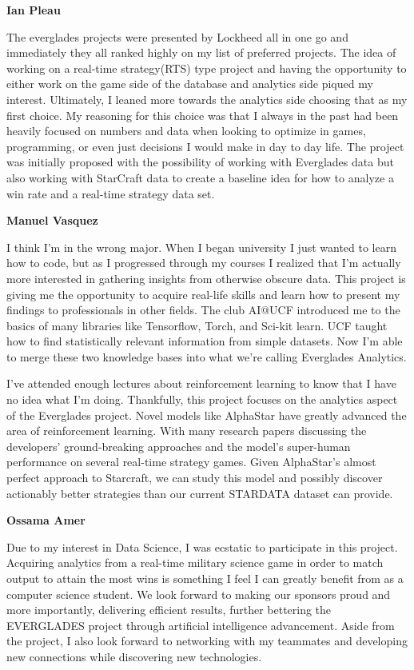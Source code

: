 \documentclass[a4paper,12pt]{report}
\newcommand{\msection}[1]{\noindent\textbf{#1}}
\begin{document}
\msection{Ian Pleau}

The everglades projects were presented by Lockheed all in one go and immediately they all ranked highly on my list of preferred projects. The idea of working on a real-time strategy(RTS) type project and having the opportunity to either work on the game side of the database and analytics side piqued my interest. Ultimately, I leaned more towards the analytics side choosing that as my first choice. My reasoning for this choice was that I always in the past had been heavily focused on numbers and data when looking to optimize in games, programming, or even just decisions I would make in day to day life. The project was initially proposed with the possibility of working with Everglades data but also working with StarCraft data to create a baseline idea for how to analyze a win rate and a real-time strategy data set.

\msection{Manuel Vasquez}

I think I’m in the wrong major. When I began university I just wanted to learn how to code, but as I progressed through my courses I realized that I’m actually more interested in gathering insights from otherwise obscure data. This project is giving me the opportunity to acquire real-life skills and learn how to present my findings to professionals in other fields. The club AI@UCF introduced me to the basics of many libraries like Tensorflow, Torch, and Sci-kit learn. UCF taught how to find statistically relevant information from simple datasets. Now I’m able to merge these two knowledge bases into what we’re calling Everglades Analytics.

I’ve attended enough lectures about reinforcement learning to know that I have no idea what I’m doing. Thankfully, this project focuses on the analytics aspect of the Everglades project. Novel models like AlphaStar have greatly advanced the area of reinforcement learning. With many research papers discussing the developers’ ground-breaking approaches and the model’s super-human performance on several real-time strategy games. Given AlphaStar’s almost perfect approach to Starcraft, we can study this model and possibly discover actionably better strategies than our current STARDATA dataset can provide.

\msection{Ossama Amer}

Due to my interest in Data Science, I was ecstatic to participate in this project. Acquiring analytics from a real-time military science game in order to match output to attain the most wins is something I feel I can greatly benefit from as a computer science student. We look forward to making our sponsors proud and more importantly, delivering efficient results, further bettering the EVERGLADES project through artificial intelligence advancement. Aside from the project, I also look forward to networking with my teammates and developing new connections while discovering new technologies.
\end{document}
